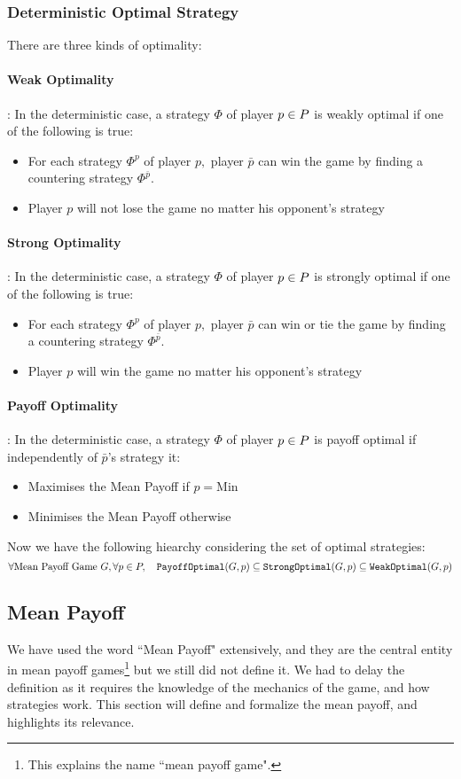 \subsubsection{Deterministic Optimal Strategy}
There are three kinds of optimality:
\paragraph{Weak Optimality}: In the deterministic case, a strategy $\Phi$ of player $p\in P$ is weakly optimal if one of the following is true:
\begin{itemize}
	\item For each strategy $\Phi^{p}$ of player $p,$ player $\bar{p}$ can win the game by finding a countering strategy $\Phi^{\bar{p}}.$
	\item Player $p$ will not lose the game no matter his opponent's strategy
\end{itemize}

\paragraph{Strong Optimality}: In the deterministic case, a strategy $\Phi$ of player $p\in P$ is strongly optimal if one of the following is true:
\begin{itemize}
	\item For each strategy $\Phi^{p}$ of player $p,$ player $\bar{p}$ can win or tie the game by finding a countering strategy $\Phi^{\bar{p}}.$
	\item Player $p$ will win the game no matter his opponent's strategy
\end{itemize}

\paragraph{Payoff Optimality}: In the deterministic case, a strategy $\Phi$ of player $p\in P$ is payoff optimal if independently of $\bar{p}$'s strategy it:
\begin{itemize}
	\item Maximises the Mean Payoff if $p=\text{Min}$ 
	\item Minimises the Mean Payoff otherwise
\end{itemize}
Now we have the following hiearchy considering the set of optimal strategies:
$$
\forall \text{Mean Payoff Game}\ G,\forall p\in P,\quad \operatorname{\mathtt{PayoffOptimal}}(G,p) \subseteq \operatorname{\mathtt{StrongOptimal}}(G,p) \subseteq \operatorname{\mathtt{WeakOptimal}}(G,p)
$$
\subsection{Mean Payoff}
We have used the word ``Mean Payoff" extensively, and they are the central entity in mean payoff games\footnote{This explains the name ``mean payoff game".} but we still did not define it.
\newline We had to delay the definition as it requires the knowledge of the mechanics of the game, and how strategies work. This section will define and formalize the mean payoff, and highlights its relevance.
